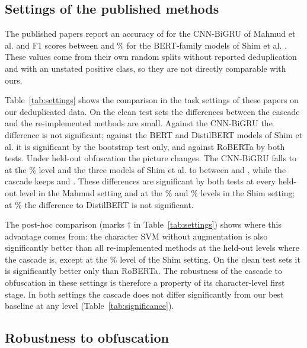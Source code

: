 \subsection{Settings of the published methods}\label{sec:published}



The published papers report an accuracy of  for the CNN-BiGRU of Mahmud et al. \cite{mahmud2024} and F1 scores between  and \% for the BERT-family models of Shim et al. \cite{shim2024}. These values come from their own random splits without reported deduplication and with an unstated positive class, so they are not directly comparable with ours.

Table~\ref{tab:settings} shows the comparison in the task settings of these papers on our deduplicated data. On the clean test sets the differences between the cascade and the re-implemented methods are small. Against the CNN-BiGRU the difference is not significant; against the BERT and DistilBERT models of Shim et al. it is significant by the bootstrap test only, and against RoBERTa by both tests. Under held-out obfuscation the picture changes. The CNN-BiGRU falls to  at the \% level and the three models of Shim et al. to between  and , while the cascade keeps  and . These differences are significant by both tests at every held-out level in the Mahmud setting and at the \% and \% levels in the Shim setting; at \% the difference to DistilBERT is not significant.

The post-hoc comparison (marks $\dagger$ in Table~\ref{tab:settings}) shows where this advantage comes from: the character SVM without augmentation is also significantly better than all re-implemented methods at the held-out levels where the cascade is, except at the \% level of the Shim setting. On the clean test sets it is significantly better only than RoBERTa. The robustness of the cascade to obfuscation in these settings is therefore a property of its character-level first stage. In both settings the cascade does not differ significantly from our best baseline at any level (Table~\ref{tab:significance}).



\subsection{Robustness to obfuscation}\label{sec:robustness}

